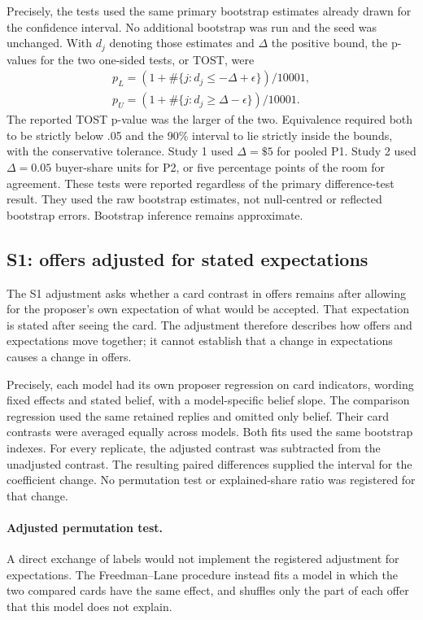 Precisely, the tests used the same primary bootstrap estimates already drawn for the confidence interval. No additional bootstrap was run and the seed was unchanged. With $d_j$ denoting those estimates and $\Delta$ the positive bound, the p-values for the two one-sided tests, or TOST, were
\[
\begin{array}{l}
p_L=(1+\#\{j:d_j\leq-\Delta+\epsilon\})/10001,\\
p_U=(1+\#\{j:d_j\geq \Delta-\epsilon\})/10001.
\end{array}
\]
The reported TOST p-value was the larger of the two. Equivalence required both to be strictly below .05 and the 90\% interval to lie strictly inside the bounds, with the conservative tolerance. Study 1 used $\Delta=\$5$ for pooled P1. Study 2 used $\Delta=0.05$ buyer-share units for P2, or five percentage points of the room for agreement. These tests were reported regardless of the primary difference-test result. They used the raw bootstrap estimates, not null-centred or reflected bootstrap errors. Bootstrap inference remains approximate.

\subsection{S1: offers adjusted for stated expectations}
\label{subapp:s1-offers-adjusted-for-stated-expectations}
The S1 adjustment asks whether a card contrast in offers remains after allowing for the proposer's own expectation of what would be accepted. That expectation is stated after seeing the card. The adjustment therefore describes how offers and expectations move together; it cannot establish that a change in expectations causes a change in offers.

Precisely, each model had its own proposer regression on card indicators, wording fixed effects and stated belief, with a model-specific belief slope. The comparison regression used the same retained replies and omitted only belief. Their card contrasts were averaged equally across models. Both fits used the same bootstrap indexes. For every replicate, the adjusted contrast was subtracted from the unadjusted contrast. The resulting paired differences supplied the interval for the coefficient change. No permutation test or explained-share ratio was registered for that change.

\paragraph{Adjusted permutation test.}
A direct exchange of labels would not implement the registered adjustment for expectations. The Freedman--Lane procedure instead fits a model in which the two compared cards have the same effect, and shuffles only the part of each offer that this model does not explain.

